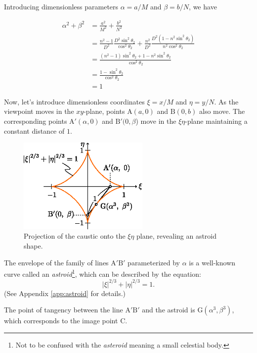 \documentclass[twocolumn]{article}
\begin{document}
Introducing dimensionless parameters $\alpha = a/M$ and $\beta = b/N$, we have

\begin{equation}
	\begin{aligned}
		\alpha^2 + \beta^2 &= \frac{a^2}{M^2} + \frac{b^2}{N^2} \\
		&= \frac{n^2-1}{D^2} \frac{D^2\sin^2\theta_2}{\cos^2\theta_2} + \frac{n^2}{D^2} \frac{D^2(1-n^2\sin^2\theta_2)}{n^2\cos^2\theta_2} \\
		&= \frac{(n^2-1)\sin^2\theta_2 + 1-n^2\sin^2\theta_2}{\cos^2\theta_2} \\
		&= \frac{1-\sin^2\theta_2}{\cos^2\theta_2} \\
		&= 1
	\end{aligned}
\end{equation}

Now, let's introduce dimensionless coordinates $\xi = x/M$ and $\eta = y/N$. As the viewpoint moves in the $xy$-plane, points $\mathrm{A}(a, 0)$ and $\mathrm{B}(0, b)$ also move. The corresponding points $\mathrm{A'}(\alpha, 0)$ and $\mathrm{B'}(0, \beta$) move in the $\xi\eta$-plane maintaining a constant distance of $1$.

\begin{figure}[!t]
	\centering
	\includegraphics[width=2.5in]{figs/g107.eps}	
	\caption{Projection of the caustic onto the $\xi\eta$ plane, revealing an astroid shape.}
	\label{fig:astroid}
\end{figure}

The envelope of the family of lines ${\mathrm{A'B'}}$ parameterized by $\alpha$ is a well-known curve called an \emph{astroid}\footnote{Not to be confused with the \emph{asteroid} meaning a small celestial body.}, which can be described by the equation:
$$ \left| \xi \right|^{2/3} + \left| \eta \right|^{2/3} = 1. $$
(See Appendix \ref{app:astroid} for details.)

The point of tangency between the line ${\mathrm{A'B'}}$ and the astroid is $\mathrm{G}(\alpha^3, \beta^3)$, which corresponds to the image point $\mathrm{C}$.
\end{document}
